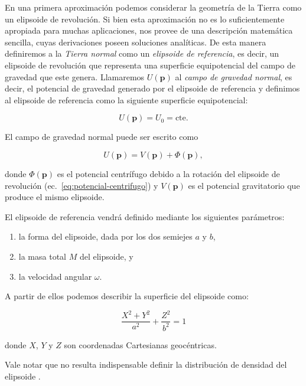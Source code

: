 En una primera aproximación podemos considerar la geometría de la Tierra como
un elipsoide de revolución. Si bien esta aproximación no es lo suficientemente
apropiada para muchas aplicaciones, nos provee de una descripción matemática
sencilla, cuyas derivaciones poseen soluciones analíticas.
De esta manera definiremos a la \emph{Tierra normal} como un \emph{elipsoide de
referencia}, es decir, un elipsoide de revolución que representa una superficie
equipotencial del campo de gravedad que este genera. Llamaremos $U(\mathbf{p})$
al \emph{campo de gravedad normal}, es decir, el potencial de gravedad generado
por el elipsoide de referencia y definimos al elipsoide de referencia como la
siguiente superficie equipotencial:

\begin{equation}
    U(\mathbf{p}) = U_0 = \text{cte}.
\end{equation}

El campo de gravedad normal puede ser escrito como

\begin{equation}
    U(\mathbf{p}) = V(\mathbf{p}) + \Phi(\mathbf{p}),
\end{equation}

\noindent donde $\Phi(\mathbf{p})$ es el potencial centrífugo debido a la
rotación del elipsoide de revolución (ec.~\ref{eq:potencial-centrifugo})
y $V(\mathbf{p})$ es el potencial gravitatorio que produce el mismo elipsoide.

El elipsoide de referencia vendrá definido mediante los siguientes parámetros:

\begin{enumerate}
    \item{la forma del elipsoide, dada por los dos semiejes $a$ y $b$,}
    \item{la masa total $M$ del elipsoide, y}
    \item{la velocidad angular $\omega$.}
\end{enumerate}

\noindent A partir de ellos podemos describir la superficie del elipsoide como:

\begin{equation}
    \frac{X^2 + Y^2}{a^2} + \frac{Z^2}{b^2} = 1
\end{equation}

\noindent donde $X$, $Y$ y $Z$ son coordenadas Cartesianas geocéntricas.

Vale notar que no resulta indispensable definir la distribución de densidad del
elipsoide \citep[][p.~64]{heiskanen1967}.


